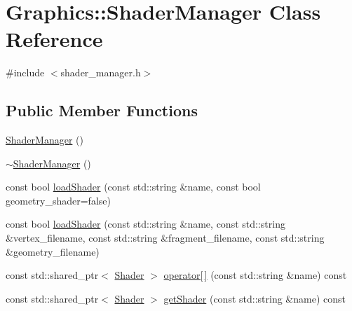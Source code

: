 \hypertarget{class_graphics_1_1_shader_manager}{}\section{Graphics\+:\+:Shader\+Manager Class Reference}
\label{class_graphics_1_1_shader_manager}


{\ttfamily \#include $<$shader\+\_\+manager.\+h$>$}

\subsection*{Public Member Functions}
\begin{DoxyCompactItemize}
\item 
\hyperlink{class_graphics_1_1_shader_manager_ac5f14e07d3b7bffa4b4cf63d9c4fb3a7}{Shader\+Manager} ()
\item 
\hyperlink{class_graphics_1_1_shader_manager_a1846632f26cfcb4907844716f23e0540}{$\sim$\+Shader\+Manager} ()
\item 
const bool \hyperlink{class_graphics_1_1_shader_manager_a29234192f964ad1d9da812e8ceab008f}{load\+Shader} (const std\+::string \&name, const bool geometry\+\_\+shader=false)
\item 
const bool \hyperlink{class_graphics_1_1_shader_manager_a0cd014938152e36fd81717dadd7e390a}{load\+Shader} (const std\+::string \&name, const std\+::string \&vertex\+\_\+filename, const std\+::string \&fragment\+\_\+filename, const std\+::string \&geometry\+\_\+filename)
\item 
const std\+::shared\+\_\+ptr$<$ \hyperlink{class_graphics_1_1_shader}{Shader} $>$ \hyperlink{class_graphics_1_1_shader_manager_a4a3c0f369be06a34a8e44ad8a41862a4}{operator\mbox{[}$\,$\mbox{]}} (const std\+::string \&name) const 
\item 
const std\+::shared\+\_\+ptr$<$ \hyperlink{class_graphics_1_1_shader}{Shader} $>$ \hyperlink{class_graphics_1_1_shader_manager_a8c82c5f8d73dbb9ec3038b2db71add41}{get\+Shader} (const std\+::string \&name) const 
\end{DoxyCompactItemize}

